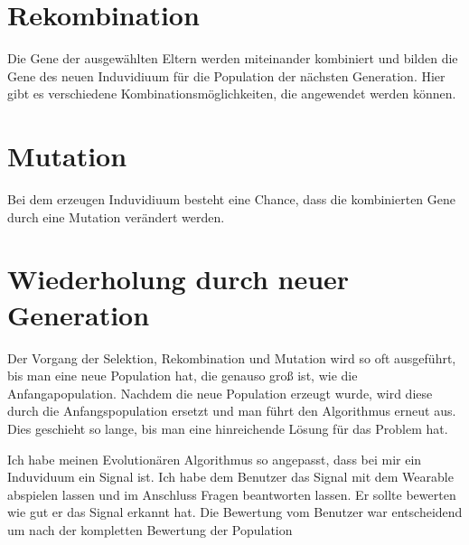 \section{Rekombination}
\label{ch:Grundlagen:sec:Rekombination}
Die Gene der ausgewählten Eltern werden miteinander kombiniert und bilden die Gene des neuen Induvidiuum für die Population der nächsten Generation. Hier gibt es verschiedene Kombinationsmöglichkeiten, die angewendet werden können.

\section{Mutation}
\label{ch:Grundlagen:sec:Mutation}
Bei dem erzeugen Induvidiuum besteht eine Chance, dass die kombinierten Gene durch eine Mutation verändert werden. 

\section{Wiederholung durch neuer Generation}
\label{ch:Grundlagen:sec:Wiederholung durch neuer Generation}
Der Vorgang der Selektion, Rekombination und Mutation wird so oft ausgeführt, bis man eine neue Population hat, die genauso groß ist, wie die Anfangapopulation.
Nachdem die neue Population erzeugt wurde, wird diese durch die Anfangspopulation ersetzt und man führt den Algorithmus erneut aus. 
Dies geschieht so lange, bis man eine hinreichende Lösung für das Problem hat. 




Ich habe meinen Evolutionären Algorithmus so angepasst, dass bei mir ein Induviduum ein Signal ist. 
Ich habe dem Benutzer das Signal mit dem Wearable abspielen lassen und im Anschluss Fragen beantworten lassen. 
Er sollte bewerten wie gut er das Signal erkannt hat. Die Bewertung vom Benutzer war entscheidend um nach der kompletten Bewertung der Population 